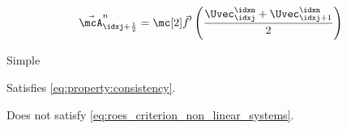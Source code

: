 \begin{defnbox}\nospacing
    \begin{defn}\label{defn:arithmetic_average_flux_non_linear_systems}
        \begin{align}
          \linfluxvec_{\idxj+\frac{1}{2}}^{n}=\fluxvec'\left(\frac{\Uvec_{\idxj}^{\idxn}+\Uvec_{\idxj+1}^{\idxn}}{2}\right)
        \end{align}
    \end{defn}
\end{defnbox}
\begin{sectionbox}\nospacing
   \begin{minipage}[t]{0.39\textwidth}
    \begin{proslist}
        \item Simple
        \item Satisfies \cref{eq:property:consistency}.
    \end{proslist}
   \end{minipage}
   \begin{minipage}[t]{0.6\textwidth}
    \begin{conslist}
        \item Does not satisfy \cref{eq:roes_criterion_non_linear_systems}.
    \end{conslist}
   \end{minipage}
\end{sectionbox}
